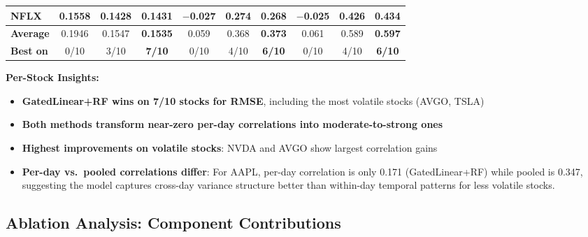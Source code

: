 \documentclass[10pt,conference]{IEEEtran}
\newcommand{\rev}[1]{#1}
\begin{document}
\begin{table}[t]
{\begin{tabular}{lccccccccc}
NFLX & 0.1558 & \rev{\textbf{0.1428}} & \rev{0.1431} & \rev{$-$0.027} & \rev{\textbf{0.274}} & \rev{0.268} & \rev{$-$0.025} & \rev{0.426} & \rev{\textbf{0.434}} \\
\midrule
\textbf{Average} & 0.1946 & \rev{0.1547} & \rev{\textbf{0.1535}} & \rev{0.059} & \rev{0.368} & \rev{\textbf{0.373}} & \rev{0.061} & \rev{0.589} & \rev{\textbf{0.597}} \\
\textbf{Best on} & 0/10 & \rev{3/10} & \rev{\textbf{7/10}} & 0/10 & \rev{4/10} & \rev{\textbf{6/10}} & 0/10 & \rev{4/10} & \rev{\textbf{6/10}} \\
\bottomrule
\end{tabular}
}
\end{table}

\textbf{Per-Stock Insights:}

\begin{itemize}
    \item \textbf{GatedLinear+RF wins on \rev{7}/10 stocks for RMSE}, including the most volatile stocks (AVGO, TSLA)
    \item \rev{\textbf{Both methods transform near-zero per-day correlations into moderate-to-strong ones}}
    \item \textbf{Highest improvements on volatile stocks}: NVDA and AVGO show largest correlation gains
    \item \rev{\textbf{Per-day vs.\ pooled correlations differ}: For AAPL, per-day correlation is only 0.171 (GatedLinear+RF) while pooled is 0.347, suggesting the model captures cross-day variance structure better than within-day temporal patterns for less volatile stocks.}
\end{itemize}

\subsection{Ablation Analysis: Component Contributions}
\end{document}
